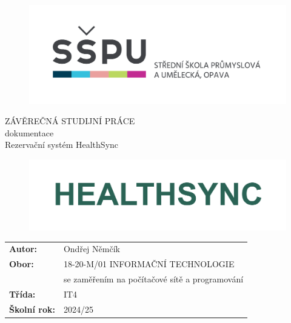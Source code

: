 \documentclass[12pt, a4paper,
openright
]{report}
\title{\nazevPrace} %
\author{\jmenoAutora} %
\date{\datumOdevzdani} %
\newcommand\obor{INFORMAČNÍ TECHNOLOGIE} %
\newcommand\kodOboru{18-20-M/01} %
\newcommand\zamereni{se zaměřením na počítačové sítě a programování} %
\newcommand\trida{IT4} %
\newcommand\jmenoAutora{Ondřej Němčík}  %
\newcommand\skolniRok{2024/25} %
\newcommand\nazevPrace{Rezervační systém HealthSync} %
\begin{document}
	
	\pagestyle{plain}
	\setcounter{page}{1}
	
	\cleardoublepage

	
	{\selectfont
		\begin{figure}[h]
			\centering
			\includegraphics[width=0.6\linewidth]{image/logo-skoly.png} 
		\end{figure}
		
		
		{\bfseries %
			\begin{center}
				\vspace{0.025 \textheight}
				\LARGE{ZÁVĚREČNÁ STUDIJNÍ PRÁCE}\\
				\large{dokumentace}\\
				\vspace{0.075 \textheight}
				\LARGE {\nazevPrace}\\
			\end{center}  
		}%
		
		\begin{figure}[h]
			\centering
			\includegraphics[width=0.8\linewidth]{image/image.png} 
		\end{figure}
		
		\vspace{0.02 \textheight}
		\begin{table}[h!]
			\begin{tabular}{ll}
				\textbf{Autor:} & \jmenoAutora\\ 
				\textbf{Obor:} & \kodOboru { } \obor\\
				\textbf{} & \zamereni\\
				\textbf{Třída:} & \trida\\
				\textbf{Školní rok:} & \skolniRok\\
			\end{tabular}
			
		\end{table}		
	}
	
\end{document}
